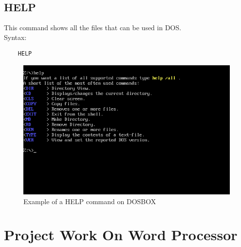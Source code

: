 \documentclass[17pt,a4paper,oneside,margin=1in]{article}
\begin{document}
\subsection{HELP}
This command shows all the files that can be used in DOS.\\
Syntax: \\
\begin{verbatim}
	HELP	
\end{verbatim}
\begin{figure}[h]
	\caption{Example of a HELP command on DOSBOX}
	\centering
	\includegraphics[width=1\textwidth]{./scrot/help.png}
\end{figure}
\pagebreak

\section{Project Work On Word Processor}
\end{document}
